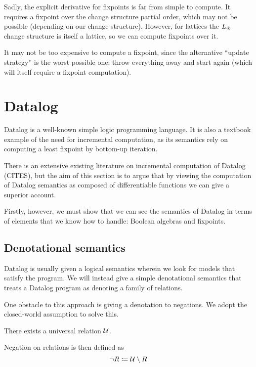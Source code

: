 Sadly, the explicit derivative for fixpoints is far from simple to compute. It requires a fixpoint over the
change structure partial order, which may not be possible (depending on our
change structure). However, for lattices the $L_\circledast$ change structure is
itself a lattice, so we can compute fixpoints over it.

It may not be too expensive to compute a fixpoint, since the alternative
``update strategy'' is the worst possible one: throw everything away and start
again (which will itself require a fixpoint computation).

\section{Datalog}
\label{sec:datalog}

Datalog is a well-known simple logic programming language. It is also a textbook
example of the need for incremental computation, as its semantics rely on
computing a least fixpoint by bottom-up iteration.

There is an extensive existing literature on incremental computation of Datalog
(CITES), but the aim of this section is to argue that by viewing the computation
of Datalog semantics as composed of differentiable functions we can give a
superior account.

Firstly, however, we must show that we can see the semantics of Datalog in terms
of elements that we know how to handle: Boolean algebras and fixpoints.

\subsection{Denotational semantics}

Datalog is usually given a logical semantics wherein we look for models that
satisfy the program. We will instead give a simple denotational semantics that treats a Datalog
program as denoting a family of relations.

One obstacle to this approach is giving a denotation to negations. We adopt the
closed-world assumption to solve this.

\begin{defn}
  There exists a universal relation $\mathcal{U}$.
  
  Negation on relations is then defined as $$\neg R \coloneqq \mathcal{U} \setminus R$$
\end{defn}

